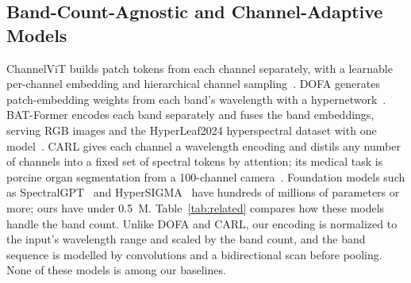\documentclass{svproc}
\begin{document}
\subsection{Band-Count-Agnostic and Channel-Adaptive Models}
ChannelViT builds patch tokens from each channel separately, with a learnable per-channel embedding and hierarchical channel sampling~\cite{channelvit}. DOFA generates patch-embedding weights from each band's wavelength with a hypernetwork~\cite{dofa}. BAT-Former encodes each band separately and fuses the band embeddings, serving RGB images and the HyperLeaf2024 hyperspectral dataset with one model~\cite{batformer}. CARL gives each channel a wavelength encoding and distils any number of channels into a fixed set of spectral tokens by attention; its medical task is porcine organ segmentation from a 100-channel camera~\cite{carl}. Foundation models such as SpectralGPT~\cite{spectralgpt} and HyperSIGMA~\cite{hypersigma} have hundreds of millions of parameters or more; ours have under 0.5~M. Table~\ref{tab:related} compares how these models handle the band count. Unlike DOFA and CARL, our encoding is normalized to the input's wavelength range and scaled by the band count, and the band sequence is modelled by convolutions and a bidirectional scan before pooling. None of these models is among our baselines.
\end{document}
